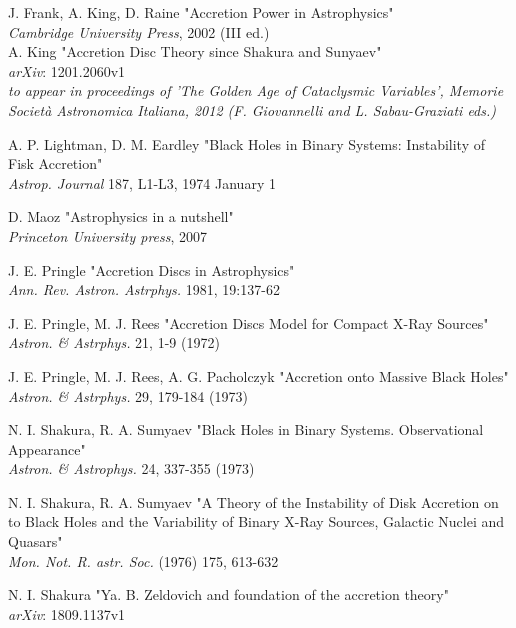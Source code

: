 \documentclass[a4paper]{article}
\begin{document}
\newpage
\begin{thebibliography}{9}
	J. Frank, A. King, D. Raine
	"Accretion Power in Astrophysics"\\
	\textit{Cambridge University Press}, 2002 (III ed.)\\
	
	A. King 
	"Accretion Disc Theory since Shakura and Sunyaev"\\
	\textit{arXiv}: 1201.2060v1\\
	\textit{to appear in proceedings of 'The Golden Age of Cataclysmic Variables', Memorie Società Astronomica Italiana, 2012 (F. Giovannelli and L. Sabau-Graziati eds.)}

	A. P. Lightman, D. M. Eardley 
	"Black Holes in Binary Systems: Instability of Fisk Accretion"\\
	\textit{Astrop. Journal} 187, L1-L3, 1974 January 1
	
	D. Maoz 
	"Astrophysics in a nutshell"\\
	\textit{Princeton University press}, 2007
		
	J. E. Pringle 
	"Accretion Discs in Astrophysics"\\
	\textit{Ann. Rev. Astron. Astrphys.} 1981, 19:137-62
		
	J. E. Pringle, M. J. Rees
	"Accretion Discs Model for Compact X-Ray Sources"\\
	\textit{Astron. \& Astrphys.} 21, 1-9 (1972)
	
	J. E. Pringle, M. J. Rees, A. G. Pacholczyk
	"Accretion onto Massive Black Holes"\\
	\textit{Astron. \& Astrphys.} 29, 179-184 (1973)
		
	N. I. Shakura, R. A. Sumyaev 
	"Black Holes in Binary Systems. Observational Appearance"\\
	\textit{Astron. \& Astrophys.} 24, 337-355 (1973)

	N. I. Shakura, R. A. Sumyaev 
	"A Theory of the Instability of Disk Accretion on to Black Holes and the Variability of Binary X-Ray Sources, Galactic Nuclei and Quasars"\\
	\textit{Mon. Not. R. astr. Soc.} (1976) 175, 613-632
	
	N. I. Shakura
	"Ya. B. Zeldovich and foundation of the accretion theory"\\
	\textit{arXiv}: 1809.1137v1


\end{thebibliography}
\end{document}
